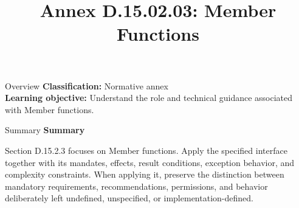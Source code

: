 \documentclass[10pt,letterpaper]{article}
\title{Annex D.15.02.03: Member Functions}
\author{}
\date{}
\begin{document}
\maketitle
\begin{CornellOverviewBox}{Overview}
\textbf{Classification:} Normative annex\\[2pt]
\textbf{Learning objective:} Understand the role and technical guidance associated with Member functions.
\end{CornellOverviewBox}\begin{CornellSummaryBox}{Summary}
{\sffamily\bfseries\color{Accent} Summary}\par\vspace{3pt}Section D.15.2.3 focuses on Member functions. Apply the specified interface together with its mandates, effects, result conditions, exception behavior, and complexity constraints. When applying it, preserve the distinction between mandatory requirements, recommendations, permissions, and behavior deliberately left undefined, unspecified, or implementation-defined.
\end{CornellSummaryBox}
\end{document}
